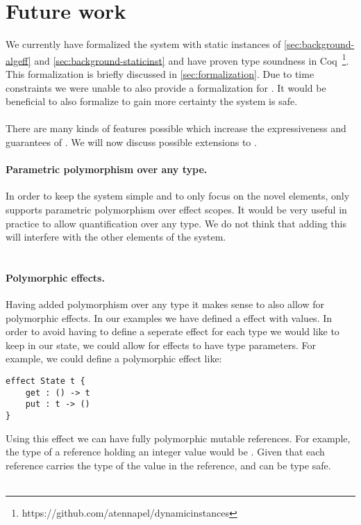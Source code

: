 \section{Future work}
We currently have formalized the system with static instances of \cref{sec:background-algeff} and \cref{sec:background-staticinst} and have proven type soundness in Coq~\footnote{https://github.com/atennapel/dynamicinstances}.
This formalization is briefly discussed in \cref{sec:formalization}.
Due to time constraints we were unable to also provide a formalization for \lang{}.
It would be beneficial to also formalize \lang{} to gain more certainty the system is safe.
\\\\
There are many kinds of features possible which increase the expressiveness and guarantees of \lang{}.
We will now discuss possible extensions to \lang{}.

\paragraph{Parametric polymorphism over any type.}
In order to keep the system simple and to only focus on the novel elements, \lang{} only supports parametric polymorphism over effect scopes.
It would be very useful in practice to allow quantification over any type.
We do not think that adding this will interfere with the other elements of the system.
\\\\
\paragraph{Polymorphic effects.}
Having added polymorphism over any type it makes sense to also allow for polymorphic effects.
In our examples we have defined a  effect with  values.
In order to avoid having to define a seperate effect for each type we would like to keep in our state, we could allow for effects to have type parameters.
For example, we could define a polymorphic  effect like:
\begin{verbatim}
effect State t {
	get : () -> t
	put : t -> ()
}
\end{verbatim}

Using this effect we can have fully polymorphic mutable references.
For example, the type of a reference holding an integer value would be .
Given that each reference carries the type of the value in the reference,  and  can be type safe.
\\\\
